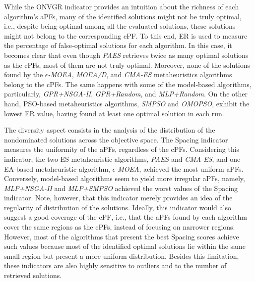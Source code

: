 While the \ac{ONVGR} indicator provides an intuition about the richness of each algorithm's \acp{aPF}, many of the identified solutions might not be truly optimal, i.e., despite being optimal among all the evaluated solutions, these solutions might not belong to the corresponding \ac{cPF}. To this end, \ac{ER} is used to measure the percentage of false-optimal solutions for each algorithm. In this case, it becomes clear that even though \textit{PAES} retrieves twice as many optimal solutions as the \acp{cPF}, most of them are not truly optimal. Moreover, none of the solutions found by the $\epsilon$\textit{-MOEA}, \textit{MOEA/D}, and \textit{CMA-ES} metaheuristics algorithms belong to the \acp{cPF}. The same happens with some of the model-based algorithms, particularly, \textit{GPR+NSGA-II}, \textit{GPR+Random}, and \textit{MLP+Random}. On the other hand, \ac{PSO}-based metaheuristics algorithms, \textit{SMPSO} and \textit{OMOPSO}, exhibit the lowest \ac{ER} value, having found at least one optimal solution in each run.

The diversity aspect consists in the analysis of the distribution of the nondominated solutions across the objective space. The Spacing indicator measures the uniformity of the \acp{aPF}, regardless of the \acp{cPF}. Considering this indicator, the two \ac{ES} metaheuristic algorithms, \textit{PAES} and \textit{CMA-ES}, and one \ac{EA}-based metaheuristic algorithm, $\epsilon$\textit{-MOEA}, achieved the most uniform \acp{aPF}. Conversely, model-based algorithms seem to yield more irregular \acp{aPF}, namely, \textit{MLP+NSGA-II} and \textit{MLP+SMPSO} achieved the worst values of the Spacing indicator. Note, however, that this indicator merely provides an idea of the regularity of distribution of the solutions. Ideally, this indicator would also suggest a good coverage of the \ac{cPF}, i.e., that the \acp{aPF} found by each algorithm cover the same regions as the \acp{cPF}, instead of focusing on narrower regions. However, most of the algorithms that present the best Spacing scores achieve such values because most of the identified optimal solutions lie within the same small region but present a more uniform distribution. Besides this limitation, these indicators are also highly sensitive to outliers and to the number of retrieved solutions. %


